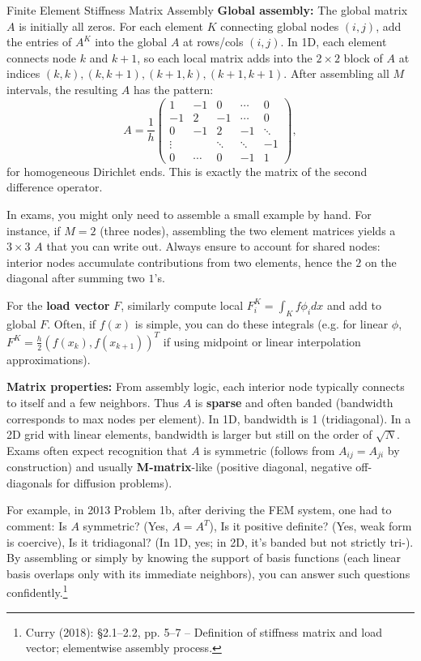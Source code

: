\documentclass[a4paper,11pt]{report}
\begin{document}
\begin{outline}{Finite Element Stiffness Matrix Assembly}{}
    \textbf{Global assembly:} The global matrix $A$ is initially all zeros. For each element $K$ connecting global nodes $(i,j)$, add the entries of $A^K$ into the global $A$ at rows/cols $(i,j)$.
    In 1D, each element connects node $k$ and $k+1$, so each local matrix adds into the $2\times2$ block of $A$ at indices $(k,k), (k,k+1), (k+1,k), (k+1,k+1)$. After assembling all $M$ intervals, the resulting $A$ has the pattern:
    $$ A = \frac{1}{h}\begin{pmatrix}
            1      & -1     & 0      & \cdots & 0      \\
            -1     & 2      & -1     & \cdots & 0      \\
            0      & -1     & 2      & -1     & \ddots \\
            \vdots &        & \ddots & \ddots & -1     \\
            0      & \cdots & 0      & -1     & 1
        \end{pmatrix}, $$
    for homogeneous Dirichlet ends.
    This is exactly the matrix of the second difference operator.

    In exams, you might only need to assemble a small example by hand.
    For instance, if $M=2$ (three nodes), assembling the two element matrices yields a $3\times3$ $A$ that you can write out.
    Always ensure to account for shared nodes: interior nodes accumulate contributions from two elements, hence the $2$ on the diagonal after summing two $1$'s.

    For the \textbf{load vector} $F$, similarly compute local $F^K_i = \int_K f\phi_idx$ and add to global $F$. Often, if $f(x)$ is simple, you can do these integrals (e.g. for linear $\phi$, $F^K = \frac{h}{2}(f(x_k), f(x_{k+1}))^T$ if using midpoint or linear interpolation approximations).

    \textbf{Matrix properties:} From assembly logic, each interior node typically connects to itself and a few neighbors. Thus $A$ is \textbf{sparse} and often banded (bandwidth corresponds to max nodes per element). In 1D, bandwidth is 1 (tridiagonal). In a 2D grid with linear elements, bandwidth is larger but still on the order of $\sqrt{N}$. Exams often expect recognition that $A$ is symmetric (follows from $A_{ij}=A_{ji}$ by construction) and usually \textbf{M-matrix}-like (positive diagonal, negative off-diagonals for diffusion problems).
\end{outline}
For example, in 2013 Problem 1b, after deriving the FEM system, one had to comment: Is $A$ symmetric? (Yes, $A=A^T$), Is it positive definite? (Yes, weak form is coercive), Is it tridiagonal? (In 1D, yes; in 2D, it's banded but not strictly tri-). By assembling or simply by knowing the support of basis functions (each linear basis overlaps only with its immediate neighbors), you can answer such questions confidently.\footnote{Curry (2018): §2.1--2.2, pp. 5--7 -- Definition of stiffness matrix and load vector; elementwise assembly process.}
\end{document}
